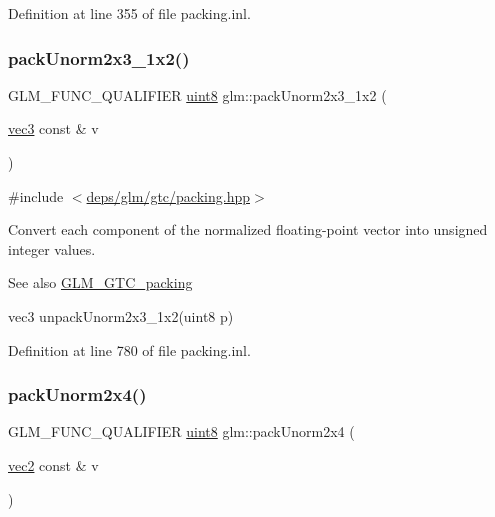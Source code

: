 Definition at line 355 of file packing.\+inl.

\mbox{\label{group__gtc__packing_ga0acca4eb99c300fe2edeef7ebd8fa08b}} 
\subsubsection{\texorpdfstring{pack\+Unorm2x3\+\_\+1x2()}{packUnorm2x3\_1x2()}}
{\footnotesize\ttfamily G\+L\+M\+\_\+\+F\+U\+N\+C\+\_\+\+Q\+U\+A\+L\+I\+F\+I\+ER \hyperlink{group__gtc__type__precision_ga1a7dcd8aac97cc8020817c94049deff2}{uint8} glm\+::pack\+Unorm2x3\+\_\+1x2 (\begin{DoxyParamCaption}\item[{\hyperlink{group__core__types_ga1c47e8b3386109bc992b6c48e91b0be7}{vec3} const \&}]{v }\end{DoxyParamCaption})}



{\ttfamily \#include $<$\hyperlink{gtc_2packing_8hpp}{deps/glm/gtc/packing.\+hpp}$>$}

Convert each component of the normalized floating-\/point vector into unsigned integer values.

\begin{DoxySeeAlso}{See also}
\hyperlink{group__gtc__packing}{G\+L\+M\+\_\+\+G\+T\+C\+\_\+packing} 

vec3 unpack\+Unorm2x3\+\_\+1x2(uint8 p) 
\end{DoxySeeAlso}


Definition at line 780 of file packing.\+inl.

\mbox{\label{group__gtc__packing_gad68eb2f848ba867192b8787998c0595a}} 
\subsubsection{\texorpdfstring{pack\+Unorm2x4()}{packUnorm2x4()}}
{\footnotesize\ttfamily G\+L\+M\+\_\+\+F\+U\+N\+C\+\_\+\+Q\+U\+A\+L\+I\+F\+I\+ER \hyperlink{group__gtc__type__precision_ga1a7dcd8aac97cc8020817c94049deff2}{uint8} glm\+::pack\+Unorm2x4 (\begin{DoxyParamCaption}\item[{\hyperlink{group__core__types_gaa1618f51db67eaa145db101d8c8431d8}{vec2} const \&}]{v }\end{DoxyParamCaption})}




